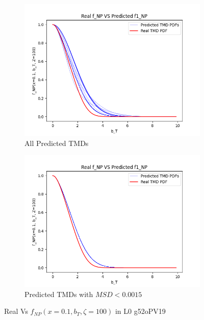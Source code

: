 \documentclass[12pt]{report}
\begin{document}
\begin{figure}[!hbp]
    \begin{subfigure}[b]{0.5\textwidth}
        \includegraphics[width=\textwidth]{Images/L0_tests/Convergent_Dist_0.01_Q_10.png}
        \caption{All Predicted TMDs}
        \label{fig:f1}
    \end{subfigure}
    \hfill
    \begin{subfigure}[b]{0.5\textwidth}
        \includegraphics[width=\textwidth]{Images/L0_tests/Convergent_Dist_0.0015_Q_10.png}
        \caption{Predicted TMDs with $MSD < 0.0015$}
        \label{fig:f2}
    \end{subfigure}
    \caption{Real Vs $f_{NP}(x=0.1, b_T, \zeta=100)$ in L0 g52oPV19}
\end{figure}
\end{document}
